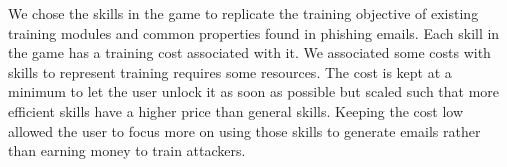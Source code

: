 \begin{table}[!ht]
    \centering
    \caption{Different skills and their effect in the game}
    \label{tab: attacker}
\end{table}

We chose the skills in the game to replicate the training objective of existing training modules and common properties found in phishing emails. Each skill in the game has a training cost associated with it. We associated some costs with skills to represent training requires some resources. The cost is kept at a minimum to let the user unlock it as soon as possible but scaled such that more efficient skills have a higher price than general skills. Keeping the cost low allowed the user to focus more on using those skills to generate emails rather than earning money to train attackers.

